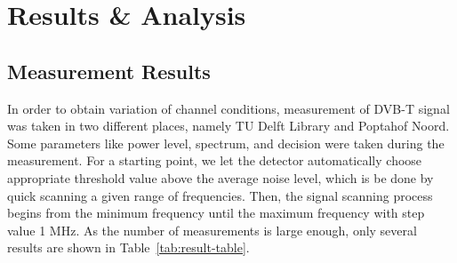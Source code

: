 \chapter{Results \& Analysis}

\section{Measurement Results}
In order to obtain variation of channel conditions, measurement of DVB-T signal was taken in two different places, namely TU Delft Library and Poptahof Noord. Some parameters like power level, spectrum, and decision were taken during the measurement. For a starting point, we let the detector automatically choose appropriate threshold value above the average noise level, which is be done by quick scanning a given range of frequencies. Then, the signal scanning process begins from the minimum frequency until the maximum frequency with step value 1 MHz. As the number of measurements is large enough, only several results are shown in Table~\ref{tab:result-table}.


